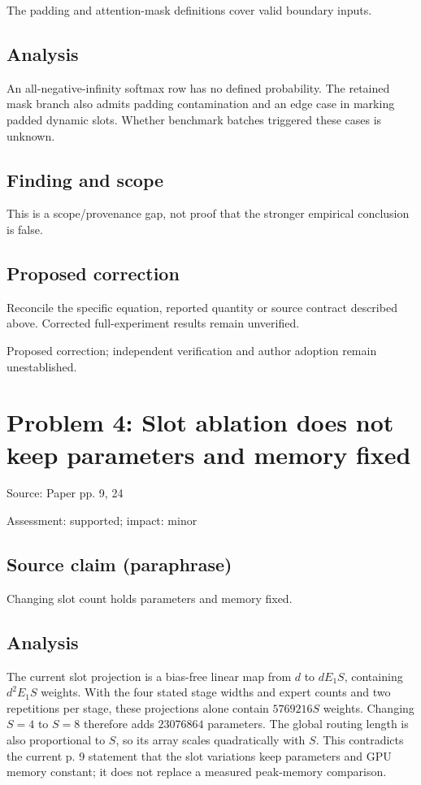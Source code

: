 \documentclass[11pt]{article}
\begin{document}
The padding and attention-mask definitions cover valid boundary inputs.

\subsection*{Analysis}

An all-negative-infinity softmax row has no defined probability. The retained mask branch also admits padding contamination and an edge case in marking padded dynamic slots. Whether benchmark batches triggered these cases is unknown.

\subsection*{Finding and scope}

This is a scope/provenance gap, not proof that the stronger empirical conclusion is false.

\subsection*{Proposed correction}

Reconcile the specific equation, reported quantity or source contract described above. Corrected full-experiment results remain unverified.

Proposed correction; independent verification and author adoption remain unestablished.

\section*{Problem 4: Slot ablation does not keep parameters and memory fixed}

Source: Paper pp. 9, 24

Assessment: supported; impact: minor

\subsection*{Source claim (paraphrase)}

Changing slot count holds parameters and memory fixed.

\subsection*{Analysis}

The current slot projection is a bias-free linear map from \(d\) to \(dE_1S\), containing \(d^2E_1S\) weights. With the four stated stage widths and expert counts and two repetitions per stage, these projections alone contain \(5769216S\) weights. Changing \(S=4\) to \(S=8\) therefore adds \(23076864\) parameters. The global routing length is also proportional to \(S\), so its array scales quadratically with \(S\). This contradicts the current p. 9 statement that the slot variations keep parameters and GPU memory constant; it does not replace a measured peak-memory comparison.
\end{document}
